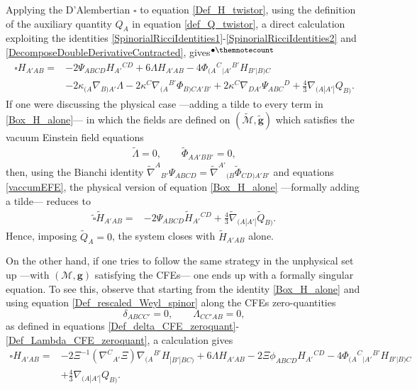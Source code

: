 \documentclass[10pt,a4paper]{article}
\theoremstyle{plain}
\def\bmg{{\bm g}}
\newcounter{mnotecount}%
\newcommand{\mnotex}[1]%
{\protect{\stepcounter{mnotecount}}$^{\mbox{\footnotesize $\bullet$\themnotecount}}$ 
\marginpar{%
\raggedright\tiny\em
$\!\!\!\!\!\!\,\bullet$\themnotecount: #1} }
\begin{document}
Applying the D'Alembertian $\square$ to equation
\eqref{Def_H_twistor}, using the definition of the auxiliary quantity
$Q_A$ in equation \eqref{def_Q_twistor}, a direct calculation exploiting the
identities \eqref{SpinorialRicciIdentities1}-\eqref{SpinorialRicciIdentities2}
and \eqref{DecomposeDoubleDerivativeContracted}, gives\mnotex{Use Bianchi here?}
\begin{align}\label{Box_H_alone}
\square H_{A'AB} = & -2 \Psi _{ABCD} H_{A'}{}^{CD} + 6 \Lambda
H_{A'AB} -4 \Phi _{(A}{}^{C}{}_{|A'}{}^{B'}H_{B'|B)C} \nonumber \\ &
-2 \kappa _{(A}\nabla_{B)A'}\Lambda -2
\kappa^{C}\nabla_{(A}{}^{B'}\Phi _{B)CA'B'} + 2 \kappa ^{C}
\nabla_{DA'}\Psi _{ABC}{}^{D} + \tfrac{4}{3} \nabla_{(A|A'|}Q_{B)}.
\end{align}
If one were discussing the physical case ---adding a tilde to every
term in \eqref{Box_H_alone}--- in which the fields are defined on
$(\tilde{\mathcal{M}},\tilde{\bmg})$ which satisfies the vacuum
Einstein field equations
\begin{align}\label{vaccumEFE}
  \tilde{\Lambda}=0, \qquad \tilde{\Phi}_{AA'BB'}=0,
\end{align}
then, using the Bianchi identity $\tilde{\nabla}^{A}{}_{B'}\Psi
_{ABCD}=\tilde{\nabla}^{A'}{}_{(B}\tilde{\Phi}_{CD)A'B'}$ and
equations \eqref{vaccumEFE},
the physical version of equation \eqref{Box_H_alone} ---formally adding a tilde---
reduces to
\begin{align}\label{Box_H_alone_physical}
  \tilde{\square} \tilde{H}_{A'AB} = & -2 \Psi _{ABCD} \tilde{H}_{A'}{}^{CD}
  + \tfrac{4}{3} \tilde{\nabla}_{(A|A'|}\tilde{Q}_{B)}.
\end{align}
Hence, imposing $\tilde{Q}_A=0$, the system
closes with $\tilde{H}_{A'AB}$ alone.


\medskip

On the other hand, if one tries to follow the same strategy in the unphysical set up
---with $(\mathcal{M},\bmg)$ satisfying the CFEs--- one ends up with a
formally singular equation. To see this, observe that starting from
the identity \eqref{Box_H_alone} and using equation \eqref{Def_rescaled_Weyl_spinor}
along the CFEs zero-quantities
\[ \delta_{ABCC'}=0, \qquad \Lambda_{CC'AB}=0,\]
as defined in equations \eqref{Def_delta_CFE_zeroquant}-\eqref{Def_Lambda_CFE_zeroquant},
a calculation gives
\begin{align}\label{WaveH_twistor_singular}
  \square H_{A'AB} = & - 2\Xi^{-1} (\nabla^{C}{}_{A'}\Xi)
    \nabla_{(A}{}^{B'}H_{|B'|BC)}+ 6 \Lambda H_{A'AB} -2 \Xi
  \phi _{ABCD}H_{A'}{}^{CD} -4
  \Phi_{(A}{}^{C}{}_{|A'}{}^{B'}H_{B'|B)C} \nonumber \\ & +
  \tfrac{4}{3} \nabla_{(A|A'|}Q_{B)}.
\end{align}
\end{document}

